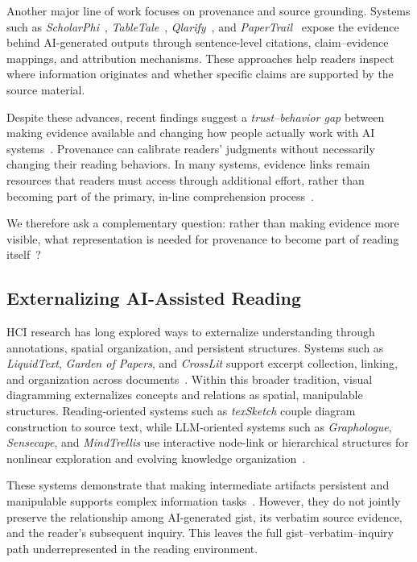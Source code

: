 \documentclass[manuscript,review,anonymous]{acmart}
\begin{document}
Another major line of work focuses on provenance and source grounding. Systems such as \textit{ScholarPhi}~\cite{scholarphi}, \textit{TableTale}~\cite{tabletale}, \textit{Qlarify}~\cite{qlarify}, and \textit{PaperTrail}~\cite{papertrail} expose the evidence behind AI-generated outputs through sentence-level citations, claim--evidence mappings, and attribution mechanisms. These approaches help readers inspect where information originates and whether specific claims are supported by the source material.

Despite these advances, recent findings suggest a \textit{trust--behavior gap} between making evidence available and changing how people actually work with AI systems~\cite{papertrail}. Provenance can calibrate readers' judgments without necessarily changing their reading behaviors. In many systems, evidence links remain resources that readers must access through additional effort, rather than becoming part of the primary, in-line comprehension process~\cite{papertrail,vered2023}.

We therefore ask a complementary question: rather than making evidence more visible, what representation is needed for provenance to become part of reading itself~\cite{pirolli2005sensemaking}?

\subsection{Externalizing AI-Assisted Reading}

HCI research has long explored ways to externalize understanding through annotations, spatial organization, and persistent structures. Systems such as \textit{LiquidText}, \textit{Garden of Papers}, and \textit{CrossLit} support excerpt collection, linking, and organization across documents~\cite{liquidtext,garden_of_papers,crosslit}. Within this broader tradition, visual diagramming externalizes concepts and relations as spatial, manipulable structures. Reading-oriented systems such as \textit{texSketch} couple diagram construction to source text, while LLM-oriented systems such as \textit{Graphologue}, \textit{Sensecape}, and \textit{MindTrellis} use interactive node-link or hierarchical structures for nonlinear exploration and evolving knowledge organization~\cite{texsketch,graphologue,sensecape,mindtrellis}.

These systems demonstrate that making intermediate artifacts persistent and manipulable supports complex information tasks~\cite{pirolli2005sensemaking}. However, they do not jointly preserve the relationship among AI-generated gist, its verbatim source evidence, and the reader's subsequent inquiry. This leaves the full gist--verbatim--inquiry path underrepresented in the reading environment.
\end{document}
